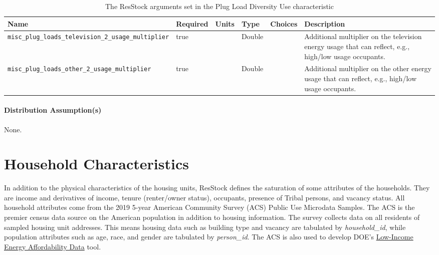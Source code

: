 \begin{longtable}[]{|p{}|p{1.5cm}|p{1.3cm}|p{1.1cm}|p{}|p{}|} \caption{The ResStock arguments set in the Plug Load Diversity Use characteristic} \label{table:hc_arg_def_plug_load_diversity}  \\
\toprule\noalign{}
Name & Required & Units & Type & Choices & Description \\
\midrule\noalign{}
\endhead
\bottomrule\noalign{}
\endlastfoot
\texttt{misc\_plug\_loads\_television\_2\_usage\_multiplier} & true & &
Double & & Additional multiplier on the television energy usage that can
reflect, e.g., high/low usage occupants. \\
\hline
\texttt{misc\_plug\_loads\_other\_2\_usage\_multiplier} & true & &
Double & & Additional multiplier on the other energy usage that can
reflect, e.g., high/low usage occupants. \\
\end{longtable}



\paragraph{Distribution Assumption(s)}
None. 

\section{Household Characteristics}

In addition to the physical characteristics of the housing units, ResStock defines the saturation of some attributes of the households. They are income and derivatives of income, tenure (renter/owner status), occupants, presence of Tribal persons, and vacancy status. All household attributes come from the 2019 5-year American Community Survey (ACS) Public Use Microdata Samples. The ACS is the premier census data source on the American population in addition to housing information. The survey collects data on all residents of sampled housing unit addresses. This means housing data such as building type and vacancy are tabulated by \textit{household\_id}, while population attributes such as age, race, and gender are tabulated by \textit{person\_id}. The ACS is also used to develop DOE’s \href{https://www.energy.gov/scep/slsc/lead-tool}{Low-Income Energy Affordability Data} tool.

